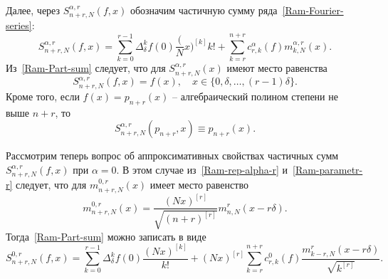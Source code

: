 Далее, через $S_{n+r,N}^{\alpha,r}(f,x)$ обозначим частичную сумму ряда~\eqref{Ram-Fourier-series}:
\begin{equation}\label{Ram-Part-sum}
S_{n+r,N}^{\alpha,r}(f,x)=\sum_{k=0}^{r-1}\Delta_\delta^kf(0){\frac(Nx)^{[k]}{k!}}+\sum_{k=r}^{n+r} c^\alpha_{r,k}(f)m^{\alpha,r}_{k,N}(x).
\end{equation}
Из~\eqref{Ram-Part-sum} следует, что для $S_{n+r,N}^{\alpha,r}(x)$ имеют место равенства
\begin{equation*}
S_{n+r,N}^{\alpha,r}(f,x)=f(x), \quad x\in\{0, \delta, \ldots, (r-1)\delta\}.
\end{equation*}
Кроме того, если $f(x)=p_{n+r}(x)$ -- алгебраический полином степени не выше $n+r$, то
\begin{equation*}
S_{n+r,N}^{\alpha,r}(p_{n+r},x)\equiv p_{n+r}(x).
\end{equation*}

Рассмотрим теперь вопрос об аппроксимативных свойствах частичных сумм \\$S_{n+r,N}^{\alpha,r}(f,x)$ при $\alpha=0$. В этом случае из~\eqref{Ram-rep-alpha-r} и~\eqref{Ram-parametr-r} следует, что для $m_{n+r,N}^{0,r}(x)$ имеет место равенство
$$
m_{n+r,N}^{0,r}(x)=\frac{(Nx)^{[r]}}{\sqrt{(n+r)^{[r]}}}m_{n,N}^r(x-r\delta).
$$
Тогда~\eqref{Ram-Part-sum} можно записать в виде
\begin{equation*}
S_{n+r,N}^{0,r}(f,x)=\sum_{k=0}^{r-1}\Delta_\delta^kf(0){\frac{(Nx)^{[k]}}{k!}}+(Nx)^{[r]}\sum_{k=r}^{n+r} c^0_{r,k}(f)\frac{m^{r}_{k-r,N}(x-r\delta)}{\sqrt{k^{[r]}}}.
\end{equation*}


